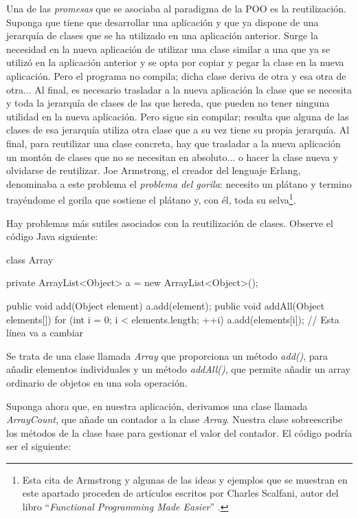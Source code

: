 Una de las \textit{promesas} que se asociaba al paradigma de la POO es la reutilización. Suponga que tiene que desarrollar una aplicación y que ya dispone de una jerarquía de clases que se ha utilizado en una aplicación anterior. Surge la necesidad en la nueva aplicación de utilizar una clase similar a una que ya se utilizó en la aplicación anterior y se opta por copiar  y pegar la clase en la nueva aplicación. Pero el programa no compila; dicha clase deriva de otra y esa otra de otra... Al final, es necesario trasladar a la nueva aplicación la clase que se necesita y toda la jerarquía de clases de las que hereda, que pueden no tener ninguna utilidad en la nueva aplicación. Pero sigue sin compilar; resulta que alguna de las clases de esa jerarquía utiliza otra clase que a su vez tiene su propia jerarquía. Al final, para reutilizar una clase concreta, hay que trasladar a la nueva aplicación un montón de clases que no se necesitan en absoluto... o hacer la clase nueva y olvidarse de reutilizar. Joe Armstrong, el creador del lenguaje Erlang, denominaba a este problema el \textit{problema del gorila}: necesito un plátano y termino trayéndome el gorila que sostiene el plátano y, con él, toda su selva\footnote{Esta cita de Armstrong y algunas de las ideas y ejemplos que se muestran en este apartado proceden de artículos escritos por Charles Scalfani, autor del libro ``\textit{Functional Programming Made Easier}'' \citep{scalfaniFunctionalProgrammingMade2021}.}.

Hay problemas más sutiles asociados con la reutilización de clases. Observe el código Java siguiente:

\vspace{0.7em}
\begin{Codigo}
class Array {
   private ArrayList<Object> a = new ArrayList<Object>();
   
   public void add(Object element) {
      a.add(element);
   }
   public void addAll(Object elements[]) {
      for (int i = 0; i < elements.length; ++i)
      a.add(elements[i]); // Esta línea va a cambiar
   }
}
\end{Codigo}

 Se trata de una clase llamada \textit{Array} que proporciona un método \textit{add()}, para añadir elementos individuales y un método \textit{addAll()}, que permite añadir un array ordinario de objetos en una sola operación. 
 
 Suponga ahora que, en nuestra aplicación, derivamos una clase llamada \textit{ArrayCount}, que añade un contador a la clase \textit{Array}. Nuestra clase sobreescribe los métodos de la clase base para gestionar el valor del contador. El código podría ser el siguiente:
  

